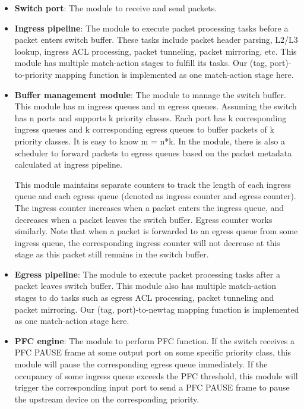 \begin{itemize}
	\item \textbf{Switch port}: The module to receive and send packets.
	
	\item \textbf{Ingress pipeline}: The module to execute packet processing tasks before a packet enters switch buffer. These tasks include packet header parsing, L2/L3 lookup, ingress ACL processing, packet tunneling, packet mirroring, etc.  This module has multiple match-action stages to fulfill its tasks. Our (tag, port)-to-priority mapping function is implemented as one match-action stage here.
	
	\item \textbf{Buffer management module}: The module to manage the switch buffer. This module has m ingress queues and m egress queues. Assuming the switch has n ports and supports k priority classes. Each port has k corresponding ingress queues and k corresponding egress queues to buffer packets of k priority classes. It is easy to know m = n*k. In the module, there is also a scheduler to forward packets to egress queues based on the packet metadata calculated at ingress pipeline.
	
	This module maintains separate counters to track the length of each ingress queue and each egress queue (denoted as ingress counter and egress counter). The ingress counter increases when a packet enters the ingress queue, and decreases when a packet leaves the switch buffer. Egress counter works similarly. Note that when a packet is forwarded to an egress queue from some ingress queue, the corresponding ingress counter will not decrease at this stage as this packet still remains in the switch buffer.
	
	\item \textbf{Egress pipeline}: The module to execute packet processing tasks after a packet leaves switch buffer. This module also has multiple match-action stages to do tasks such as egress ACL processing, packet tunneling and packet mirroring. Our (tag, port)-to-newtag mapping function is implemented as one match-action stage here.
	
	\item \textbf{PFC engine}: The module to perform PFC function. If the switch receives a PFC PAUSE frame at some output port on some specific priority class, this module will pause the corresponding egress queue immediately. If the occupancy of some ingress queue exceeds the PFC threshold, this module will trigger the corresponding input port to send a PFC PAUSE frame to pause the upstream device on the corresponding priority. 

\end{itemize}


